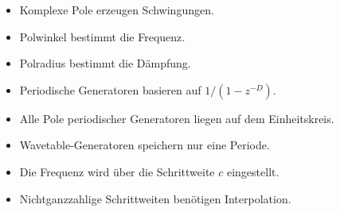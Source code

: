 \begin{itemize}
\item Komplexe Pole erzeugen Schwingungen.
\item Polwinkel bestimmt die Frequenz.
\item Polradius bestimmt die Dämpfung.
\item Periodische Generatoren basieren auf $1/(1-z^{-D})$.
\item Alle Pole periodischer Generatoren liegen auf dem Einheitskreis.
\item Wavetable-Generatoren speichern nur eine Periode.
\item Die Frequenz wird über die Schrittweite $c$ eingestellt.
\item Nichtganzzahlige Schrittweiten benötigen Interpolation.
\end{itemize}
